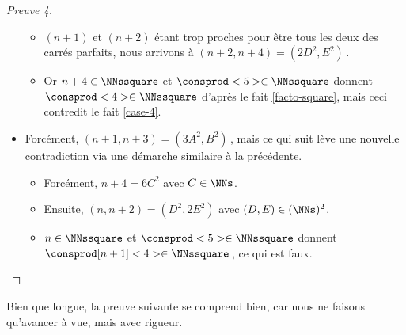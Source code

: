 \begin{proof}[Preuve 4]
\begin{itemize}
\begin{itemize}
			\item $(n+1)$ et $(n+2)$ étant trop proches pour être tous les deux des carrés parfaits, nous arrivons à $(n + 2, n + 4) = (2 D^2, E^2)$\,.

			\item Or $n + 4 \in \NNssquare$ et $\consprod<5> \in \NNssquare$ donnent $\consprod<4> \in \NNssquare$ d'après le fait \ref{facto-square}, mais ceci contredit le fait \ref{case-4}.
		\end{itemize}
	
		\item Forcément, $(n + 1, n + 3) = (3 A^2, B^2)$\,, mais ce qui suit lève une nouvelle contradiction via une démarche similaire à la précédente.
		\begin{itemize}
			\item Forcément, $n + 4 = 6 C^2$ avec $C \in \NNs$. 

			\item Ensuite, $(n, n + 2) = (D^2, 2 E^2)$ avec $(D, E) \in ( \NNs )^2$.

			\item $n \in \NNssquare$ et $\consprod<5> \in \NNssquare$ donnent $\consprod[n+1]<4> \in \NNssquare$\,, ce qui est faux.\qedhere
		\end{itemize}
    \end{itemize}
\end{proof}




Bien que longue, la preuve suivante se comprend bien, car nous ne faisons qu'avancer à vue, mais avec rigueur.


